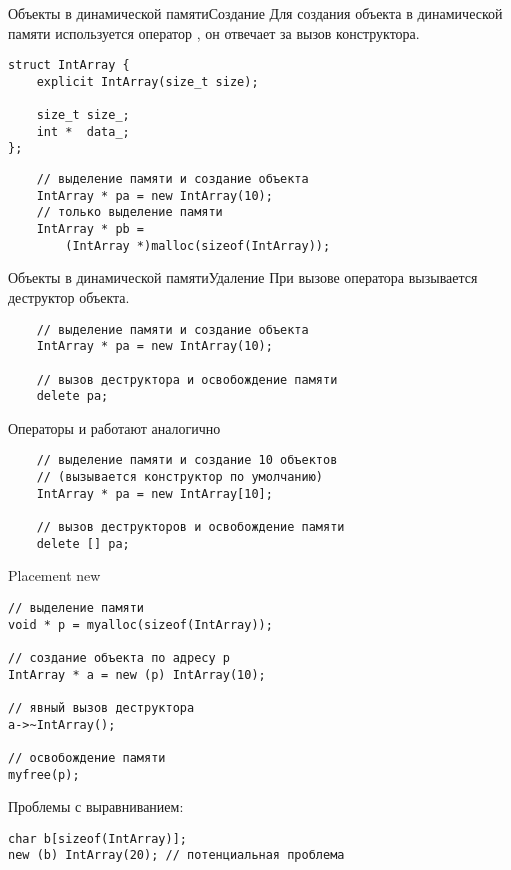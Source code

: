 \documentclass{beamer}
\begin{document}
\begin{frame}[fragile]{Объекты в динамической памяти}{Создание}
Для создания объекта в динамической памяти используется оператор ,
он отвечает за вызов конструктора.
\begin{lstlisting}
struct IntArray {
    explicit IntArray(size_t size);

    size_t size_;
    int *  data_;
};
\end{lstlisting}
\begin{lstlisting}
    // выделение памяти и создание объекта
    IntArray * pa = new IntArray(10);
    // только выделение памяти
    IntArray * pb = 
        (IntArray *)malloc(sizeof(IntArray));
\end{lstlisting}
\end{frame}

\begin{frame}[fragile]{Объекты в динамической памяти}{Удаление}
    При вызове оператора  вызывается
    деструктор объекта.
\begin{lstlisting}
    // выделение памяти и создание объекта
    IntArray * pa = new IntArray(10);

    // вызов деструктора и освобождение памяти
    delete pa;
\end{lstlisting}
    Операторы  и  работают аналогично
\begin{lstlisting}
    // выделение памяти и создание 10 объектов
    // (вызывается конструктор по умолчанию)
    IntArray * pa = new IntArray[10];

    // вызов деструкторов и освобождение памяти
    delete [] pa;
\end{lstlisting}
\end{frame}

\begin{frame}[fragile]{Placement new}{}
\begin{lstlisting}
// выделение памяти
void * p = myalloc(sizeof(IntArray));

// создание объекта по адресу p
IntArray * a = new (p) IntArray(10);

// явный вызов деструктора 
a->~IntArray();

// освобождение памяти
myfree(p);
\end{lstlisting}
Проблемы с выравниванием:
\begin{lstlisting}
char b[sizeof(IntArray)];
new (b) IntArray(20); // потенциальная проблема
\end{lstlisting}
\end{frame}
\end{document}
